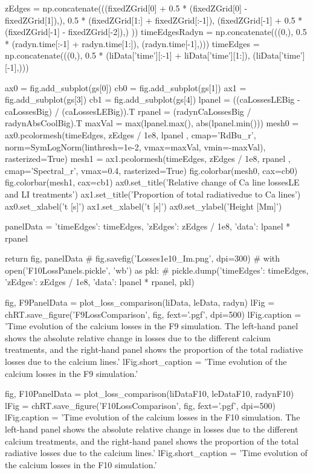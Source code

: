 \begin{pycode}[TimeDepRT]
    zEdges = np.concatenate(((fixedZGrid[0] + 0.5 * (fixedZGrid[0] - fixedZGrid[1]),),
                    0.5 * (fixedZGrid[1:] + fixedZGrid[:-1]),
                    (fixedZGrid[-1] + 0.5 * (fixedZGrid[-1] - fixedZGrid[-2]),)
                   ))
    timeEdgesRadyn = np.concatenate(((0,), 0.5 * (radyn.time[:-1] + radyn.time[1:]), (radyn.time[-1],)))
    timeEdges = np.concatenate(((0,), 0.5 * (liData['time'][:-1] + liData['time'][1:]), (liData['time'][-1],)))

    ax0 = fig.add_subplot(gs[0])
    cb0 = fig.add_subplot(gs[1])
    ax1 = fig.add_subplot(gs[3])
    cb1 = fig.add_subplot(gs[4])
    lpanel = ((caLossesLEBig - caLossesBig) / (caLossesLEBig)).T
    rpanel = (radynCaLossesBig / radynAbsCoolBig).T
    maxVal = max(lpanel.max(), abs(lpanel.min()))
    mesh0 = ax0.pcolormesh(timeEdges, zEdges / 1e8,
                           lpanel
                           , cmap='RdBu_r', norm=SymLogNorm(linthresh=1e-2, vmax=maxVal, vmin=-maxVal),
                           rasterized=True)
    mesh1 = ax1.pcolormesh(timeEdges, zEdges / 1e8,
                           rpanel
                           , cmap='Spectral_r', vmax=0.4,
                           rasterized=True)
    fig.colorbar(mesh0, cax=cb0)
    fig.colorbar(mesh1, cax=cb1)
    ax0.set_title('Relative change of Ca line losses\nwith LE and LI treatments')
    ax1.set_title('Proportion of total radiative\nlosses due to Ca lines')
    ax0.set_xlabel('t [s]')
    ax1.set_xlabel('t [s]')
    ax0.set_ylabel('Height [Mm]')

    panelData = {'timeEdges': timeEdges, 'zEdges': zEdges / 1e8, 'data': lpanel * rpanel}

    return fig, panelData
    # fig.savefig('Losses1e10_Im.png', dpi=300)
    # with open('F10LossPanels.pickle', 'wb') as pkl:
    #     pickle.dump({'timeEdges': timeEdges, 'zEdges': zEdges / 1e8, 'data': lpanel * rpanel}, pkl)

fig, F9PanelData = plot_loss_comparison(liData, leData, radyn)
lFig = chRT.save_figure('F9LossComparison', fig, fext='.pgf', dpi=500)
lFig.caption = 'Time evolution of the calcium losses in the F9 simulation. The left-hand panel shows the absolute relative change in losses due to the different calcium treatments, and the right-hand panel shows the proportion of the total radiative losses due to the calcium lines.'
lFig.short_caption = 'Time evolution of the calcium losses in the F9 simulation.'

fig, F10PanelData = plot_loss_comparison(liDataF10, leDataF10, radynF10)
lFig = chRT.save_figure('F10LossComparison', fig, fext='.pgf', dpi=500)
lFig.caption = 'Time evolution of the calcium losses in the F10 simulation. The left-hand panel shows the absolute relative change in losses due to the different calcium treatments, and the right-hand panel shows the proportion of the total radiative losses due to the calcium lines.'
lFig.short_caption = 'Time evolution of the calcium losses in the F10 simulation.'
\end{pycode}

